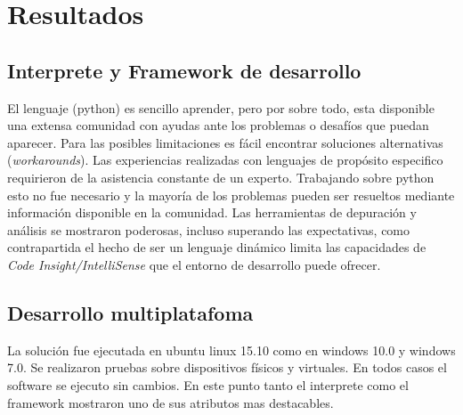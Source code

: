 \documentclass[twoside,twocolumn]{article}
\begin{document}
\section{Resultados}
\label{sec:resultados}


\subsection{Interprete y Framework de desarrollo}
El lenguaje (python) es sencillo aprender, pero por sobre todo, esta disponible 
una extensa comunidad con ayudas ante los problemas o desafíos que puedan 
aparecer. Para las posibles limitaciones es fácil 
encontrar soluciones alternativas (\textit{workarounds}). Las experiencias 
realizadas con lenguajes de propósito especifico requirieron de la 
asistencia constante de un experto. Trabajando sobre python esto no fue 
necesario y la mayoría de los problemas pueden ser resueltos mediante 
información disponible en la comunidad. Las herramientas de depuración y análisis se mostraron poderosas, incluso superando las expectativas, como contrapartida el hecho de ser un lenguaje dinámico limita las capacidades de \textit{Code Insight/IntelliSense} que el entorno de desarrollo puede ofrecer.
 



\subsection{Desarrollo multiplatafoma}
La solución fue ejecutada en ubuntu linux 15.10 como en windows 10.0 y windows 
7.0. Se realizaron pruebas sobre dispositivos físicos y virtuales. En todos casos el software se ejecuto sin cambios. En este punto tanto el interprete como el framework mostraron uno de sus atributos mas destacables.
\end{document}
